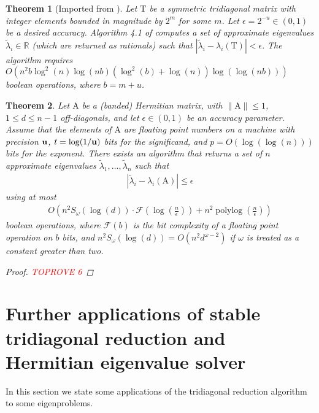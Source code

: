 \documentclass{article}
\newcommand{\labs}{\left|}
\newcommand{\rabs}{\right|}
\newcommand{\lpar}{\left(}
\newcommand{\rpar}{\right)}
\newtheorem{theorem}{Theorem}[section]
\DeclareMathOperator{\polylog}{polylog}
\newcommand\matA{\boldsymbol{\mathrm{A}}}
\newcommand\matT{\boldsymbol{\mathrm{T}}}
\newcommand{\umach}{\textbf{\textup{u}}}
\newcommand{\matmulexponent}{\omega}
\newcommand{\flopcost}{\mathcal{F}}
\begin{document}
\begin{theorem}[Imported from \cite{bini1991parallel,bini1998computing}]
Let $\matT$ be a symmetric tridiagonal matrix with integer elements bounded in magnitude by $2^m$ for some $m$. Let $\epsilon=2^{-u}\in(0,1)$ be a desired accuracy. Algorithm 4.1 of \cite{bini1991parallel} computes a set of approximate eigenvalues $\widetilde\lambda_i\in\mathbb{R}$ (which are returned as rationals) such that
$
    \labs \widetilde\lambda_i-\lambda_i(\matT) \rabs < \epsilon.
$
The algorithm requires
$
    O\lpar
        n^2b\log^2(n)\log(nb)(\log^2(b)+\log(n))\log(\log(nb))
    \rpar
$
boolean operations, where $b=m+u$.
\label{theorem:bini_pan_tridiagonal_eigenvalues}
\end{theorem}

\begin{theorem}
    \label{theorem:hermitian_eigenvalues}
    Let $\matA$ be a (banded) Hermitian matrix, with $\|\matA\|\leq 1$, $1\leq d\leq n-1$ off-diagonals, and let $\epsilon\in(0,1)$ be an  accuracy parameter. Assume that the elements of $\matA$ are floating point numbers on a machine with precision $\umach$, $t=\log(1/\umach)$ bits for the significand, and $p=O(\log(\log(n)))$ bits for the exponent. There exists an algorithm that returns a set of $n$ approximate eigenvalues $\widetilde\lambda_1,\ldots,\widetilde\lambda_n$ such that
    \begin{align*}
        \labs \widetilde\lambda_i - \lambda_i(\matA) \rabs
        \leq
        \epsilon
    \end{align*}
    using at most 
    \begin{align*}
        O\lpar
            n^2S_{\matmulexponent}(\log(d))\cdot \flopcost(\log(\tfrac{n}{\epsilon}))
            +
            n^2\polylog(\tfrac{n}{\epsilon})
        \rpar
    \end{align*}
    boolean operations, where $\flopcost(b)$ is the bit complexity of a floating point operation on $b$ bits, and  $n^2S_{\matmulexponent}(\log(d))=O(n^2d^{\matmulexponent-2})$ if $\omega$ is treated as a constant greater than two.
    \begin{proof}\textcolor{red}{TOPROVE 6}\end{proof}
\end{theorem}



\section{Further applications of stable tridiagonal reduction and Hermitian eigenvalue solver}
\label{section:applications_tridiagonal_reduction}
In this section we state some applications of the tridiagonal reduction algorithm to some eigenproblems.
\end{document}
